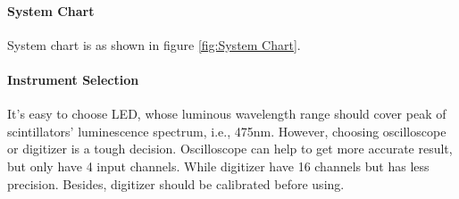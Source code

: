 \documentclass[11pt,a4paper]{article}
\begin{document}
\paragraph{System Chart}
System chart is as shown in figure \ref{fig:System Chart}.

\paragraph{Instrument Selection}It's easy to choose LED, whose luminous wavelength range should cover peak of scintillators' luminescence spectrum, i.e., 475nm.
However, choosing oscilloscope or digitizer is a tough decision. Oscilloscope can help to get more accurate result, but only have 4 input channels. While digitizer have
16 channels but has less precision. Besides, digitizer should be calibrated before using.
\end{document}
